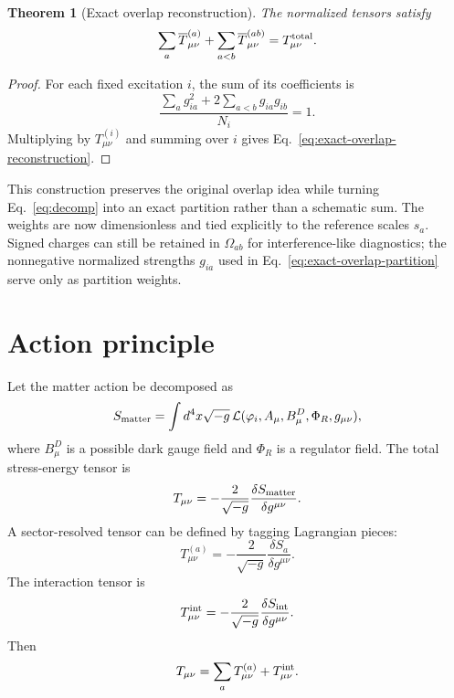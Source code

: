 \documentclass[11pt]{article}
\newtheorem{theorem}{Theorem}
\theoremstyle{remark}
\begin{document}
\begin{theorem}[Exact overlap reconstruction]
The normalized tensors satisfy
\begin{equation}
 \sum_a\overline T^{(a)}_{\mu\nu}
 +\sum_{a<b}\overline T^{(ab)}_{\mu\nu}
 =T^{\rm total}_{\mu\nu}.
 \label{eq:exact-overlap-reconstruction}
\end{equation}
\end{theorem}

\begin{proof}
For each fixed excitation $i$, the sum of its coefficients is
\begin{equation}
 \frac{\sum_a g_{ia}^2+2\sum_{a<b}g_{ia}g_{ib}}{N_i}=1.
\end{equation}
Multiplying by $T^{(i)}_{\mu\nu}$ and summing over $i$ gives Eq.~\eqref{eq:exact-overlap-reconstruction}.
\end{proof}

This construction preserves the original overlap idea while turning Eq.~\eqref{eq:decomp} into an exact partition rather than a schematic sum. The weights are now dimensionless and tied explicitly to the reference scales $s_a$. Signed charges can still be retained in $\Omega_{ab}$ for interference-like diagnostics; the nonnegative normalized strengths $g_{ia}$ used in Eq.~\eqref{eq:exact-overlap-partition} serve only as partition weights.


\section{Action principle}
Let the matter action be decomposed as
\begin{equation}
    S_{\rm matter}=\int d^4x\sqrt{-g}\,\mathcal L(\varphi_i,A_\mu,B_\mu^D,\Phi_R,g_{\mu\nu}),
\end{equation}
where $B_\mu^D$ is a possible dark gauge field and $\Phi_R$ is a regulator field. The total stress-energy tensor is
\begin{equation}
    T_{\mu\nu}= -\frac{2}{\sqrt{-g}}\frac{\delta S_{\rm matter}}{\delta g^{\mu\nu}}.
\end{equation}
A sector-resolved tensor can be defined by tagging Lagrangian pieces:
\begin{equation}
    T^{(a)}_{\mu\nu}= -\frac{2}{\sqrt{-g}}\frac{\delta S_a}{\delta g^{\mu\nu}}.
\end{equation}
The interaction tensor is
\begin{equation}
    T^{\rm int}_{\mu\nu}= -\frac{2}{\sqrt{-g}}\frac{\delta S_{\rm int}}{\delta g^{\mu\nu}}.
\end{equation}
Then
\begin{equation}
    T_{\mu\nu}=\sum_a T^{(a)}_{\mu\nu}+T^{\rm int}_{\mu\nu}.
\end{equation}
\end{document}
